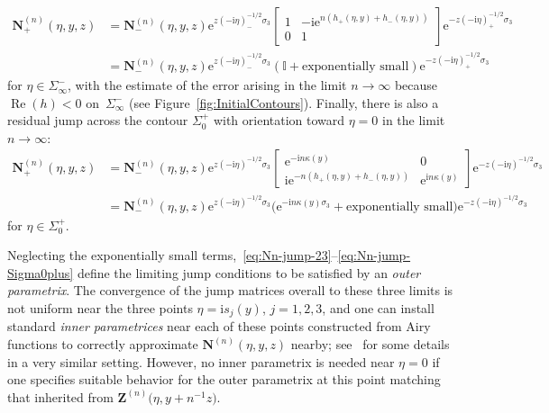 \begin{align*}
\mathbf{N}^{(n)}_+(\eta,y,z)&=\mathbf{N}^{(n)}_-(\eta,y,z)\mathrm{e}^{z(-\mathrm{i}\eta)^{-1/2}_-\sigma_3}\begin{bmatrix}1&-\mathrm{i}\mathrm{e}^{n(h_+(\eta,y)+h_-(\eta,y))}\\0 & 1\end{bmatrix}\mathrm{e}^{-z(-\mathrm{i}\eta)^{-1/2}_+\sigma_3}\\ &=
\mathbf{N}^{(n)}_-(\eta,y,z)\mathrm{e}^{z(-\mathrm{i}\eta)^{-1/2}_-\sigma_3}\left(\mathbb{I} + \text{exponentially small}\right)\mathrm{e}^{-z(-\mathrm{i}\eta)^{-1/2}_+\sigma_3}
\end{align*}
for $\eta\in\Sigma_\infty^-$, with the estimate of the error arising in the limit $n\to\infty$ because $\operatorname{Re}(h)<0$ on~$\Sigma_\infty^-$ (see Figure~\ref{fig:InitialContours}). Finally, there is also a residual jump across the contour $\Sigma_0^+$ with orientation toward $\eta=0$ in the limit $n\to\infty$:
\begin{align}
\mathbf{N}^{(n)}_+(\eta,y,z)&=\mathbf{N}^{(n)}_-(\eta,y,z)\mathrm{e}^{z(-\mathrm{i}\eta)^{-1/2}\sigma_3}\begin{bmatrix}
\mathrm{e}^{-\mathrm{i} n \kappa(y)} & 0 \\
\mathrm{i}\mathrm{e}^{-n(h_+(\eta,y)+h_-(\eta,y))} & \mathrm{e}^{\mathrm{i} n\kappa(y)}
\end{bmatrix}\mathrm{e}^{-z(-\mathrm{i}\eta)^{-1/2}\sigma_3}\label{eq:Nn-jump-Sigma0plus}
\\
&=\mathbf{N}^{(n)}_-(\eta,y,z)\mathrm{e}^{z(-\mathrm{i}\eta)^{-1/2}\sigma_3}\bigl(\mathrm{e}^{-\mathrm{i} n\kappa(y)\sigma_3} + \text{exponentially small}\bigr)\mathrm{e}^{-z(-\mathrm{i}\eta)^{-1/2}\sigma_3}\nonumber
\end{align}
for $\eta\in\Sigma_0^+$.

Neglecting the exponentially small terms,~\eqref{eq:Nn-jump-23}--\eqref{eq:Nn-jump-Sigma0plus} define the limiting jump conditions to be satisfied by an \emph{outer parametrix}. The convergence of the jump matrices overall to these three limits is not uniform near the three points $\eta=\mathrm{i} s_j(y)$, $j=1,2,3$, and one can
install standard \emph{inner parametrices} near each of these points constructed from Airy functions to correctly approximate $\mathbf{N}^{(n)}(\eta,y,z)$ nearby; see~\cite[Section 4.4.2]{BuckinghamM22} for some details in a very similar setting. However, no inner parametrix is needed near $\eta=0$ if one specifies suitable behavior for the outer parametrix at this point matching that inherited from $\mathbf{Z}^{(n)}\bigl(\eta,y+n^{-1}z\bigr)$.

